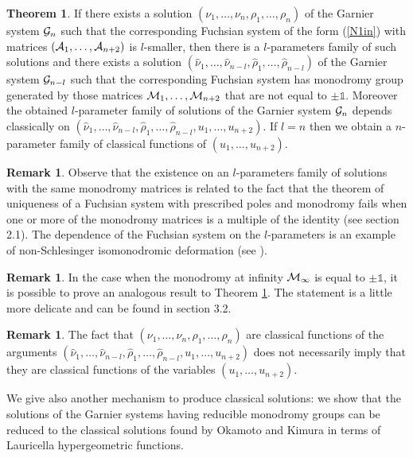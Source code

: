 \documentclass[12pt]{article}
\newcommand{\ID}{\mathbb{1}}
\theoremstyle{definition}
\newtheorem{rmk}[df]{Remark}
\theoremstyle{theorem}
\newtheorem{thm}[df]{Theorem}
\begin{document}
\begin{thm}
If there exists a solution $(\nu_1,\dots,\nu_n,\rho_1,\dots,\rho_n)$
of the Garnier system ${\cal G}_{n}$ such that the corresponding 
Fuchsian system of the form (\ref{N1in}) with matrices 
$({\cal A}_1,\dots,{\cal A}_{n+2})$ is $l$-smaller, then there is 
a $l$-parameters 
family of such solutions and there exists a solution $(\hat\nu_1,
\dots,\hat\nu_{n-l},\hat\rho_1,\dots,\hat\rho_{n-l})$
of the Garnier system ${\cal G}_{n-l}$ such that the corresponding
Fuchsian system has monodromy group generated by those matrices 
${\cal M}_1,\dots,{\cal M}_{n+2}$ that are not equal to $\pm\ID$. 
Moreover the obtained $l$-parameter family of solutions of the 
Garnier system ${\cal G}_{n}$ depends classically on 
$(\hat\nu_1,\dots,\hat\nu_{n-l},\hat\rho_1,
\dots,\hat\rho_{n-l},u_1,\dots,u_{n+2})$. If $l=n$ then we obtain a
$n$-parameter family of classical functions of $(u_1,\dots,u_{n+2})$.
\label{mainthmsm}\end{thm}

\begin{rmk}
Observe that the existence on an $l$-parameters family of solutions
with the same monodromy matrices is related to the fact that 
the theorem of uniqueness of a Fuchsian system with prescribed poles and 
monodromy fails when one or more of the monodromy matrices is a
multiple of the identity (see section 2.1). The dependence of the
Fuchsian system on the $l$-parameters is an example of non-Schlesinger
isomonodromic deformation (see \cite{Bol}).
\label{rm0.1.0}\end{rmk}

\begin{rmk}
In the case when the monodromy at infinity ${\cal M}_\infty$ is 
equal to $\pm\ID$, it is possible to prove an analogous result to 
Theorem \ref{mainthmsm}. The statement is a little more delicate 
and can be found in section 3.2.
\label{rm0.0.0}\end{rmk}

\begin{rmk}
The fact that $(\nu_1,\dots,\nu_n,\rho_1,\dots,\rho_n)$ are classical 
functions of the arguments 
$(\hat\nu_1,\dots,\hat\nu_{n-l},\hat\rho_1,
\dots,\hat\rho_{n-l}, u_1,\dots,u_{n+2})$ does not necessarily imply 
that they are classical functions of the variables $(u_1,\dots,u_{n+2})$.  
\label{rm0.0}\end{rmk}

We give also another mechanism to produce classical solutions:
we show that the solutions of the Garnier systems having reducible
monodromy groups can be reduced to the classical solutions found by 
Okamoto and Kimura in terms of Lauricella hypergeometric functions.
\end{document}
